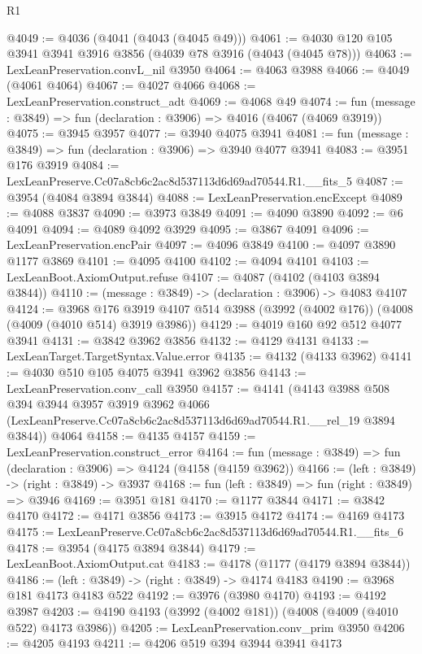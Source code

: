 \begin{lexlean}{R1}
\begin{coremodule}
@4049 := @4036 (@4041 (@4043 (@4045 @49)))
@4061 := @4030 @120 @105 @3941 @3941 @3916 @3856 (@4039 @78 @3916 (@4043 (@4045 @78)))
@4063 := LexLeanPreservation.convL_nil @3950
@4064 := @4063 @3988
@4066 := @4049 (@4061 @4064)
@4067 := @4027 @4066
@4068 := LexLeanPreservation.construct_adt
@4069 := @4068 @49
@4074 := fun (message : @3849) => fun (declaration : @3906) => @4016 (@4067 (@4069 @3919))
@4075 := @3945 @3957
@4077 := @3940 @4075 @3941
@4081 := fun (message : @3849) => fun (declaration : @3906) => @3940 @4077 @3941
@4083 := @3951 @176 @3919
@4084 := LexLeanPreserve.Cc07a8cb6c2ac8d537113d6d69ad70544.R1.__fits_5
@4087 := @3954 (@4084 @3894 @3844)
@4088 := LexLeanPreservation.encExcept
@4089 := @4088 @3837
@4090 := @3973 @3849
@4091 := @4090 @3890
@4092 := @6 @4091
@4094 := @4089 @4092 @3929
@4095 := @3867 @4091
@4096 := LexLeanPreservation.encPair
@4097 := @4096 @3849
@4100 := @4097 @3890 @1177 @3869
@4101 := @4095 @4100
@4102 := @4094 @4101
@4103 := LexLeanBoot.AxiomOutput.refuse
@4107 := @4087 (@4102 (@4103 @3894 @3844))
@4110 := (message : @3849) -> (declaration : @3906) -> @4083 @4107
@4124 := @3968
    @176
    @3919
    @4107
    @514
    @3988
    (@3992 (@4002 @176))
    (@4008 (@4009 (@4010 @514) @3919 @3986))
@4129 := @4019 @160 @92 @512 @4077 @3941
@4131 := @3842 @3962 @3856
@4132 := @4129 @4131
@4133 := LexLeanTarget.TargetSyntax.Value.error
@4135 := @4132 (@4133 @3962)
@4141 := @4030 @510 @105 @4075 @3941 @3962 @3856
@4143 := LexLeanPreservation.conv_call @3950
@4157 := @4141
    (@4143
      @3988
      @508
      @394
      @3944
      @3957
      @3919
      @3962
      @4066
      (LexLeanPreserve.Cc07a8cb6c2ac8d537113d6d69ad70544.R1.__rel_19 @3894 @3844))
    @4064
@4158 := @4135 @4157
@4159 := LexLeanPreservation.construct_error
@4164 := fun (message : @3849) => fun (declaration : @3906) => @4124 (@4158 (@4159 @3962))
@4166 := (left : @3849) -> (right : @3849) -> @3937
@4168 := fun (left : @3849) => fun (right : @3849) => @3946
@4169 := @3951 @181
@4170 := @1177 @3844
@4171 := @3842 @4170
@4172 := @4171 @3856
@4173 := @3915 @4172
@4174 := @4169 @4173
@4175 := LexLeanPreserve.Cc07a8cb6c2ac8d537113d6d69ad70544.R1.__fits_6
@4178 := @3954 (@4175 @3894 @3844)
@4179 := LexLeanBoot.AxiomOutput.cat
@4183 := @4178 (@1177 (@4179 @3894 @3844))
@4186 := (left : @3849) -> (right : @3849) -> @4174 @4183
@4190 := @3968 @181 @4173 @4183 @522
@4192 := @3976 (@3980 @4170)
@4193 := @4192 @3987
@4203 := @4190 @4193 (@3992 (@4002 @181)) (@4008 (@4009 (@4010 @522) @4173 @3986))
@4205 := LexLeanPreservation.conv_prim @3950
@4206 := @4205 @4193
@4211 := @4206 @519 @394 @3944 @3941 @4173

\end{coremodule}
\end{lexlean}
